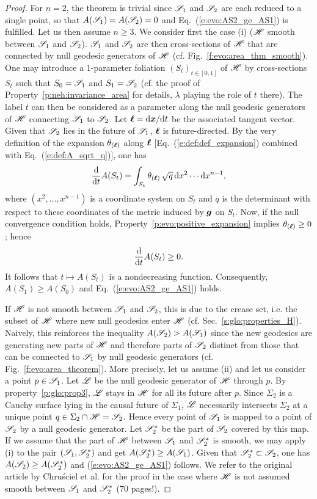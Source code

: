 \begin{proof}
For $n=2$, the theorem is trivial since $\mathscr{S}_1$ and $\mathscr{S}_2$ are each reduced to a
single point, so that $A(\mathscr{S}_1) = A(\mathscr{S}_2) = 0$ and Eq.~(\ref{e:evo:AS2_ge_AS1}) is fulfilled.
Let us then assume $n\geq 3$.
We consider first the case (i) ($\mathscr{H}$ smooth between
$\mathscr{S}_1$ and $\mathscr{S}_2$).
$\mathscr{S}_1$ and $\mathscr{S}_2$ are then cross-sections of $\mathscr{H}$
that are connected by null geodesic generators of $\mathscr{H}$
(cf. Fig.~\ref{f:evo:area_thm_smooth}).
One may introduce a 1-parameter foliation $(S_t)_{t\in [0,1]}$ of $\mathscr{H}$ by
cross-sections $S_t$ such that $S_0 = \mathscr{S}_1$ and $S_1 = \mathscr{S}_2$
(cf. the proof of Property~\ref{p:neh:invariance_area} for details, $\lambda$
playing the role of $t$ there). The label $t$
can then be considered as a parameter along the null geodesic generators of $\mathscr{H}$
connecting $\mathscr{S}_1$ to $\mathscr{S}_2$.
Let $\bm{\ell} = \mathrm{d}\bm{x}/\mathrm{d} t$ be the associated tangent vector.
Given that $\mathscr{S}_2$ lies in the future of $\mathscr{S}_1$, $\bm{\ell}$ is future-directed.
By the very definition
of the expansion $\theta_{(\bm{\ell})}$ along $\bm{\ell}$ [Eq.~(\ref{e:def:def_expansion})
combined with Eq.~(\ref{e:def:A_sqrt_q})], one has
\[
    \frac{\mathrm{d} }{\mathrm{d} t} A(S_t) = \int_{S_t} \theta_{(\bm{\ell})} \,  \sqrt{q} \, \mathrm{d} x^2 \cdots \mathrm{d} x^{n-1} ,
\]
where $(x^2, \ldots, x^{n-1})$ is a coordinate system on $S_t$ and $q$ is
the determinant with respect to these coordinates of the metric
induced by $\bm{g}$ on $S_t$.
Now, if the null convergence condition holds, Property~\ref{p:evo:positive_expansion} implies
$\theta_{(\bm{\ell})} \geq 0$; hence
\[
  \frac{\mathrm{d} }{\mathrm{d} t} A(S_t) \geq 0 .
\]
It follows that $t\mapsto A(S_t)$ is a nondecreasing function. Consequently, $A(S_1) \geq A(S_0)$
and Eq.~(\ref{e:evo:AS2_ge_AS1}) holds.

If $\mathscr{H}$ is not smooth between $\mathscr{S}_1$ and $\mathscr{S}_2$, this is due to the crease set,
i.e. the subset of $\mathscr{H}$ where new null geodesics enter $\mathscr{H}$ (cf. Sec.~\ref{s:glo:properties_H}).
Naively, this reinforces the inequality $A(\mathscr{S}_2) > A(\mathscr{S}_1)$ since the new geodesics
are generating new parts of $\mathscr{H}$ and therefore parts of $\mathscr{S}_2$ distinct
from those that can be connected to $\mathscr{S}_1$ by null geodesic generators
(cf. Fig.~\ref{f:evo:area_theorem}). More precisely, let us assume (ii) and
let us consider a point $p\in\mathscr{S}_1$. Let $\mathscr{L}$ be the null geodesic
generator of $\mathscr{H}$ through $p$. By property~\ref{p:glo:prop3}, $\mathscr{L}$ stays in $\mathscr{H}$ for all its future after $p$. Since $\Sigma_2$ is a Cauchy surface lying in the causal future of $\Sigma_1$, $\mathscr{L}$
necessarily intersects $\Sigma_2$ at a unique point $q \in \Sigma_2\cap\mathscr{H} = \mathscr{S}_2$.
Hence every point of $\mathscr{S}_1$ is mapped to a point of $\mathscr{S}_2$ by a null geodesic generator.
Let $\mathscr{S}_2^*$ be the part of $\mathscr{S}_2$ covered by this map.
If we assume that the part of $\mathscr{H}$ between $\mathscr{S}_1$ and $\mathscr{S}_2^*$ is smooth,
we may apply (i) to the pair $(\mathscr{S}_1, \mathscr{S}_2^*)$
and get $A(\mathscr{S}_2^*) \geq A(\mathscr{S}_1)$. Given that $\mathscr{S}_2^* \subset \mathscr{S}_2$, one has
$A(\mathscr{S}_2) \geq A(\mathscr{S}_2^*)$ and (\ref{e:evo:AS2_ge_AS1}) follows.
We refer to the original article by Chru\'sciel et al. \cite{ChrusDGH01} for the proof in the case where
$\mathscr{H}$ is not assumed smooth between $\mathscr{S}_1$ and $\mathscr{S}_2^*$ (70 pages!).
\end{proof}

